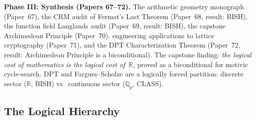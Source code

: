 \documentclass[11pt,a4paper]{article}
\begin{document}
\textbf{Phase III: Synthesis (Papers 67--72).}  The arithmetic geometry monograph (Paper~67), the CRM audit of Fermat's Last Theorem (Paper~68, result: BISH), the function field Langlands audit (Paper~69, result: BISH), the capstone Archimedean Principle (Paper~70), engineering applications to lattice cryptography (Paper~71), and the DPT Characterization Theorem (Paper~72, result: Archimedean Principle is a biconditional).  The capstone finding: \emph{the logical cost of mathematics is the logical cost of~$\mathbb{R}$}, proved as a biconditional for motivic cycle-search.  DPT and Fargues--Scholze are a logically forced partition: discrete sector ($\mathbb{R}$, BISH) vs.\ continuous sector ($\mathbb{Q}_p$, CLASS).

\newpage
\subsection*{The Logical Hierarchy}
\end{document}
